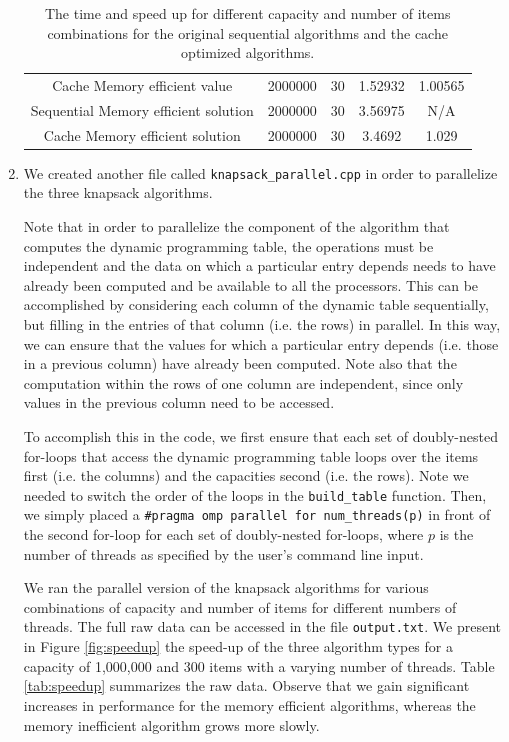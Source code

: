 \documentclass[10pt]{article}
\begin{document}
\begin{enumerate}
\begin{table}[h!]
\begin{center}
\begin{tabular}{|c|c|c|c|c|}
 Cache Memory efficient value & 2000000 & 30 & 1.52932 & 1.00565  \\
 Sequential Memory efficient solution & 2000000 & 30 & 3.56975 & N/A \\
 Cache Memory efficient solution & 2000000 & 30 & 3.4692 & 1.029 \\
 \hline
 \end{tabular}
 \caption{The time and speed up for different capacity and number of items combinations for the original sequential algorithms and the cache optimized algorithms.\label{tab:cache}}
 \end{center}
 \end{table}


\item We created another file called \texttt{knapsack\_parallel.cpp} in order to parallelize the three knapsack algorithms. 

Note that in order to parallelize the component of the algorithm that computes the dynamic programming table, the operations must be independent and the data on which a particular entry depends needs to have already been computed and be available to all the processors. This can be accomplished by considering each column of the dynamic table sequentially, but filling in the entries of that column (i.e. the rows) in parallel. In this way, we can ensure that the values for which a particular entry depends (i.e. those in a previous column) have already been computed. Note also that the computation within the rows of one column are independent, since only values in the previous column need to be accessed. 

To accomplish this in the code, we first ensure that each set of doubly-nested for-loops that access the dynamic programming table loops over the items first (i.e. the columns) and the capacities second (i.e. the rows). Note we needed to switch the order of the loops in the \texttt{build\_table} function. Then, we simply placed a \texttt{\#pragma omp parallel for num\_threads(p)} in front of the second for-loop for each set of doubly-nested for-loops, where $p$ is the number of threads as specified by the user's command line input. 

We ran the parallel version of the knapsack algorithms for various combinations of capacity and number of items for different numbers of threads. The full raw data can be accessed in the file \texttt{output.txt}. We present in Figure \ref{fig:speedup} the speed-up of the three algorithm types for a capacity of 1,000,000 and 300 items with a varying number of threads. Table \ref{tab:speedup} summarizes the raw data. Observe that we gain significant increases in performance for the memory efficient algorithms, whereas the memory inefficient algorithm grows more slowly.


\end{enumerate}
\end{document}
